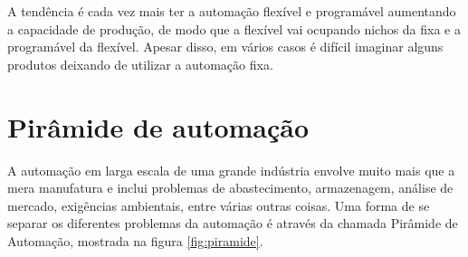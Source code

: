 A tendência é cada vez mais ter a automação flexível e programável aumentando a capacidade de produção, de modo que a flexível vai ocupando nichos da fixa e a programável da flexível. Apesar disso, em vários casos é difícil imaginar alguns produtos deixando de utilizar a automação fixa.

\section{Pirâmide de automação}

A automação em larga escala de uma grande indústria envolve muito mais que a mera manufatura e inclui problemas de abastecimento, armazenagem, análise de mercado, exigências ambientais, entre várias outras coisas. Uma forma de se separar os diferentes problemas da automação é através da chamada Pirâmide de Automação, mostrada na figura \ref{fig:piramide}.

